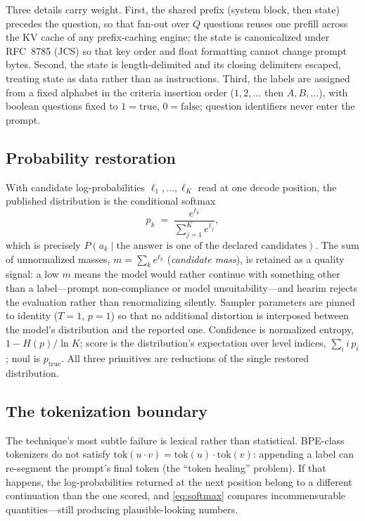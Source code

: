 \documentclass[11pt]{article}
\begin{document}
Three details carry weight. First, the shared prefix (system block, then
state) precedes the question, so that fan-out over $Q$ questions reuses
one prefill across the KV cache of any prefix-caching engine; the state is
canonicalized under RFC~8785 (JCS) so that key order and float formatting
cannot change prompt bytes. Second, the state is length-delimited and its
closing delimiters escaped, treating state as data rather than as
instructions. Third, the labels are assigned from a fixed alphabet in the
criteria insertion order ($1,2,\dots$ then $A,B,\dots$), with boolean
questions fixed to $1=\text{true}$, $0=\text{false}$; question identifiers
never enter the prompt.

\subsection{Probability restoration}

With candidate log-probabilities $\ell_1, \dots, \ell_K$ read at one decode
position, the published distribution is the conditional softmax
\begin{equation}
p_k \;=\; \frac{e^{\ell_k}}{\sum_{j=1}^{K} e^{\ell_j}},
\label{eq:softmax}
\end{equation}
which is precisely $P(a_k \mid \text{the answer is one of the declared
candidates})$. The sum of unnormalized masses,
$m = \sum_k e^{\ell_k}$ (\emph{candidate mass}), is retained as a quality
signal: a low $m$ means the model would rather continue with something
other than a label---prompt non-compliance or model unsuitability---and
hearim rejects the evaluation rather than renormalizing silently. Sampler
parameters are pinned to identity ($T{=}1$, $p{=}1$) so that no additional
distortion is interposed between the model's distribution and the reported
one. Confidence is normalized entropy, $1 - H(p)/\ln K$; score is the
distribution's expectation over level indices, $\sum_i i \, p_i$; noul is
$p_{\text{true}}$. All three primitives are reductions of the single
restored distribution.

\subsection{The tokenization boundary}
\label{sec:boundary}

The technique's most subtle failure is lexical rather than statistical.
BPE-class tokenizers do not satisfy
$\mathrm{tok}(u \cdot v) = \mathrm{tok}(u) \cdot \mathrm{tok}(v)$: appending
a label can re-segment the prompt's final token (the ``token healing''
problem). If that happens, the log-probabilities returned at the next
position belong to a different continuation than the one scored, and
\eqref{eq:softmax} compares incommensurable quantities---still producing
plausible-looking numbers.
\end{document}

